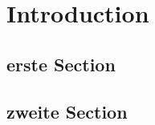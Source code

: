 \chapter{Introduction}
\label{ch:introduction}




\section{erste Section}
\label{sec:erste-section}


\section{zweite Section}
\label{sec:zweite-section}

